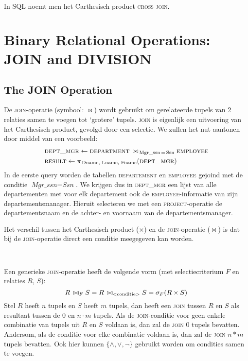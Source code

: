 In SQL noemt men het Carthesisch product \textsc{cross join}.



\section{Binary Relational Operations: JOIN and DIVISION}
\subsection{The JOIN Operation}
De \textsc{join}-operatie (symbool: $\bowtie$) wordt gebruikt om gerelateerde tupels van 2 relaties samen te voegen tot `grotere' tupels. \textsc{join} is eigenlijk een uitvoering van het Carthesisch product, gevolgd door een selectie. We zullen het nut aantonen door middel van een voorbeeld:
\vspace{-2mm}
\begin{align*}
&\textsc{dept\_mgr} \leftarrow \textsc{department} \,\bowtie_{\,\text{Mgr\_ssn} \,=\, \text{Ssn}} \textsc{employee}\\
&\textsc{result} \leftarrow \pi_{\,\text{Dname, Lname, Fname}}(\textsc{dept\_mgr})\\
\end{align*}
In de eerste query worden de tabellen \textsc{departement} en \textsc{employee} gejoind met de conditie $\textit{Mgr\_ssn}=\textit{Ssn}$. We krijgen dus in \textsc{dept\_mgr} een lijst van alle departementen met voor elk departement ook de \textsc{employee}-informatie van zijn departementsmanager. Hieruit selecteren we met een \textsc{project}-operatie de departementsnaam en de achter- en voornaam van de departementsmanager.

Het verschil tussen het Carthesisch product ($\times$) en de \textsc{join}-operatie ($\bowtie$) is dat bij de \textsc{join}-operatie direct een conditie meegegeven kan worden.

~

\noindent Een generieke \textsc{join}-operatie heeft de volgende vorm (met selectiecriterium $F$ en relaties $R$, $S$):
\vspace{-2mm}
\[ R \,\bowtie_F S = R \,\bowtie_{\text{{\textless}conditie{\textgreater}}} S = \sigma_F(R \times S) \]
Stel $R$ heeft $n$ tupels en $S$ heeft $m$ tupels, dan heeft een \textsc{join} tussen $R$ en $S$ als resultaat tussen de $0$ en $n \cdot m$ tupels. Als de \textsc{join}-conditie voor geen enkele combinatie van tupels uit $R$ en $S$ voldaan is, dan zal de \textsc{join} $0$ tupels bevatten. Andersom, als de conditie voor elke combinatie voldaan is, dan zal de \textsc{join} $n*m$ tupels bevatten. Ook hier kunnen $\{ \wedge, \vee, \neg \}$ gebruikt worden om condities samen te voegen.

